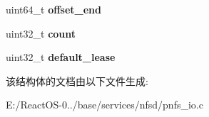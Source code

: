 \begin{DoxyCompactItemize}
\item 
\mbox{\label{struct____pnfs__io__pattern_a867589a366212c957d9d0544c3853e95}} 
uint64\+\_\+t {\bfseries offset\+\_\+end}
\item 
\mbox{\label{struct____pnfs__io__pattern_a5c1b132bad314f191e0cb861cbc24da2}} 
uint32\+\_\+t {\bfseries count}
\item 
\mbox{\label{struct____pnfs__io__pattern_a0bd2d545b4d5f32839d95b3d5867bd10}} 
uint32\+\_\+t {\bfseries default\+\_\+lease}
\end{DoxyCompactItemize}


该结构体的文档由以下文件生成\+:\begin{DoxyCompactItemize}
\item 
E\+:/\+React\+O\+S-\/0../base/services/nfsd/pnfs\+\_\+io.\+c\end{DoxyCompactItemize}
